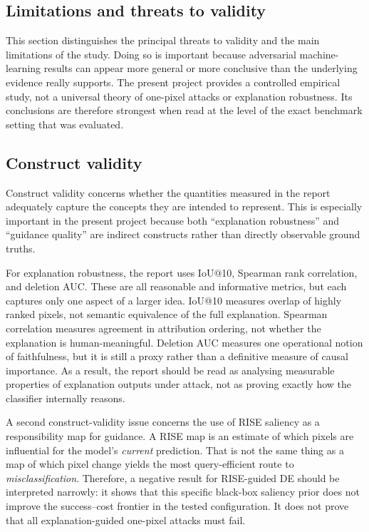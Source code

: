\subsection{Limitations and threats to validity}
\label{sec:threats_to_validity}

This section distinguishes the principal threats to validity and the main limitations of the study.
Doing so is important because adversarial machine-learning results can appear more general or more conclusive than the underlying evidence really supports.
The present project provides a controlled empirical study, not a universal theory of one-pixel attacks or explanation robustness.
Its conclusions are therefore strongest when read at the level of the exact benchmark setting that was evaluated.

\subsection{Construct validity}
Construct validity concerns whether the quantities measured in the report adequately capture the concepts they are intended to represent.
This is especially important in the present project because both ``explanation robustness'' and ``guidance quality'' are indirect constructs rather than directly observable ground truths.

For explanation robustness, the report uses IoU@10, Spearman rank correlation, and deletion AUC.
These are all reasonable and informative metrics, but each captures only one aspect of a larger idea.
IoU@10 measures overlap of highly ranked pixels, not semantic equivalence of the full explanation.
Spearman correlation measures agreement in attribution ordering, not whether the explanation is human-meaningful.
Deletion AUC measures one operational notion of faithfulness, but it is still a proxy rather than a definitive measure of causal importance.
As a result, the report should be read as analysing measurable properties of explanation outputs under attack, not as proving exactly how the classifier internally reasons.

A second construct-validity issue concerns the use of RISE saliency as a responsibility map for guidance.
A RISE map is an estimate of which pixels are influential for the model's \emph{current} prediction.
That is not the same thing as a map of which pixel change yields the most query-efficient route to \emph{misclassification}.
Therefore, a negative result for RISE-guided DE should be interpreted narrowly: it shows that this specific black-box saliency prior does not improve the success--cost frontier in the tested configuration.
It does not prove that all explanation-guided one-pixel attacks must fail.

